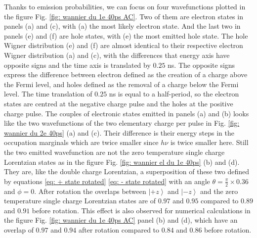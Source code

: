 Thanks to emission probabilities, we can focus on four wavefunctions plotted in the figure Fig. \ref{fig: wannier du 1e 40ps AC}.
Two of them are electron states in panels (a) and (c), with (a) the most likely electron state.
And the last two in panels (e) and (f) are hole states, with (e) the most emitted hole state.
The hole Wigner distribution (e) and (f) are almost identical to their respective electron Wigner distribution (a) and (c), with the differences that energy axis have opposite signs and the time axis is translated by $0.25$ ns.
The opposite signs express the difference between electron defined as the creation of a charge above the Fermi level, and holes defined as the removal of a charge below the Fermi level.
The time translation of $0.25$ ns is equal to a half-period, so the electron states are centred at the negative charge pulse and the holes at the positive charge pulse.
The couples of electronic states emitted in panels (a) and (b) looks like the two wavefunctions of the two elementary charge per pulse in Fig. \ref{fig: wannier du 2e 40ps} (a) and (c).
Their difference is their energy steps in the occupation marginals which are twice smaller since $h\nu$ is twice smaller here.
Still the two emitted wavefunction are not the zero temperature single charge Lorentzian states as in the figure Fig. \ref{fig: wannier el du 1e 40ps} (b) and (d).
They are, like the double charge Lorentzian, a superposition of these two defined by equations \eqref{eq: + state rotated} \eqref{eq: - state rotated} with an angle $\theta = \frac{\pi}{2}\times 0.36$ and $\phi = 0$.
After rotation the overlaps between $\left|+z\right>$ and $\left|-z\right>$ and the zero temperature single charge Lorentzian states are of $0.97$ and $0.95$ compared to $0.89$ and $0.91$ before rotation.
This effect is also observed for numerical calculations in the figure Fig. \ref{fig: wannier du 1e 40ps AC} panel (b) and (d), which have an overlap of $0.97$ and $0.94$ after rotation compared to $0.84$ and $0.86$ before rotation.



